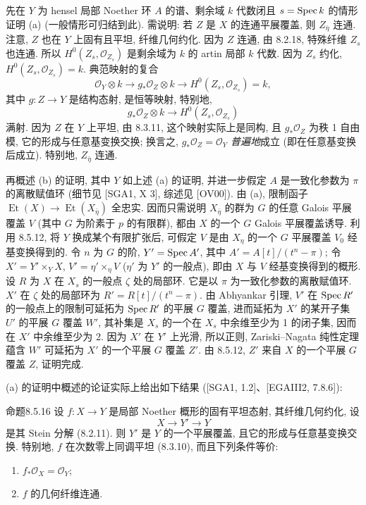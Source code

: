 先在 $Y$ 为 hensel 局部 Noether 环 $A$ 的谱、剩余域 $k$ 代数闭且 $s=\operatorname{Spec} k$ 的情形证明 (a) (一般情形可归结到此). 需说明: 若 $Z$ 是 $X$ 的连通平展覆盖, 则 $Z_{\bar\eta}$ 连通. 注意, $Z$ 也在 $Y$ 上固有且平坦, 纤维几何约化. 因为 $Z$ 连通, 由 8.2.18, 特殊纤维 $Z_s$ 也连通. 所以 $H^0(Z_s,\mathcal O_{Z_s})$ 是剩余域为 $k$ 的 artin 局部 $k$ 代数. 因为 $Z_s$ 约化, $H^0(Z_s,\mathcal O_{Z_s})=k$. 典范映射的复合
\[\mathcal O_Y\otimes k\longrightarrow g_*\mathcal O_Z\otimes k\longrightarrow H^0(Z_s,\mathcal O_{Z_s})=k,\]
其中 $g:Z\to Y$ 是结构态射, 是恒等映射, 特别地,
\[g_*\mathcal O_Z\otimes k\longrightarrow H^0(Z_s,\mathcal O_{Z_s})\]
满射. 因为 $Z$ 在 $Y$ 上平坦, 由 8.3.11, 这个映射实际上是同构, 且 $g_*\mathcal O_Z$ 为秩 1 自由模, 它的形成与任意基变换交换; 换言之, $g_*\mathcal O_Z=\mathcal O_Y$ \emph{普遍地}成立 (即在任意基变换后成立). 特别地, $Z_{\bar\eta}$ 连通.

再概述 (b) 的证明, 其中 $Y$ 如上述 (a) 的证明, 并进一步假定 $A$ 是一致化参数为 $\pi$ 的离散赋值环 (细节见 [SGA1, X 3], 综述见 [OV00]). 由 (a), 限制函子 $\operatorname{Et}(X)\to\operatorname{Et}(X_{\bar\eta})$ 全忠实. 因而只需说明 $X_{\bar\eta}$ 的群为 $G$ 的任意 Galois 平展覆盖 $V$ (其中 $G$ 为阶素于 $p$ 的有限群), 都由 $X$ 的一个 $G$ Galois 平展覆盖诱导. 利用 8.5.12, 将 $Y$ 换成某个有限扩张后, 可假定 $V$ 是由 $X_\eta$ 的一个 $G$ 平展覆盖 $V_0$ 经基变换得到的. 令 $n$ 为 $G$ 的阶, $Y'=\operatorname{Spec} A'$, 其中 $A'=A[t]/(t^n-\pi)$; 令 $X'=Y'\times_YX$, $V'=\eta'\times_\eta V$ ($\eta'$ 为 $Y'$ 的一般点), 即由 $X$ 与 $V$ 经基变换得到的概形. 设 $R$ 为 $X$ 在 $X_s$ 的一般点 $\zeta$ 处的局部环. 它是以 $\pi$ 为一致化参数的离散赋值环. $X'$ 在 $\zeta$ 处的局部环为 $R'=R[t]/(t^n-\pi)$. 由 Abhyankar 引理, $V'$ 在 $\operatorname{Spec} R'$ 的一般点上的限制可延拓为 $\operatorname{Spec} R'$ 的平展 $G$ 覆盖, 进而延拓为 $X'$ 的某开子集 $U'$ 的平展 $G$ 覆盖 $W'$, 其补集是 $X_s$ 的一个在 $X_s$ 中余维至少为 1 的闭子集, 因而在 $X'$ 中余维至少为 2. 因为 $X'$ 在 $Y'$ 上光滑, 所以正则, Zariski--Nagata 纯性定理蕴含 $W'$ 可延拓为 $X'$ 的一个平展 $G$ 覆盖 $Z'$. 由 8.5.12, $Z'$ 来自 $X$ 的一个平展 $G$ 覆盖 $Z$, 证明完成.

(a) 的证明中概述的论证实际上给出如下结果 ([SGA1, 1.2]、[EGAIII2, 7.8.6]):
\begin{origstatement}{命题}{8.5.16}\label{ch08:prop8516}
设 $f:X\to Y$ 是局部 Noether 概形的固有平坦态射, 其纤维几何约化, 设
\[X\longrightarrow Y'\longrightarrow Y\]
是其 Stein 分解 (8.2.11). 则 $Y'$ 是 $Y$ 的一个平展覆盖, 且它的形成与任意基变换交换. 特别地, $f$ 在次数零上同调平坦 (8.3.10), 而且下列条件等价:
\begin{enumerate}\item[(i)] $f_*\mathcal O_X=\mathcal O_Y$;\item[(ii)] $f$ 的几何纤维连通.\end{enumerate}
\end{origstatement}

